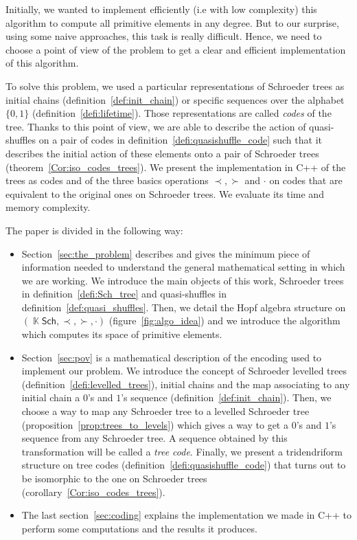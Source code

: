 \documentclass[a4paper,10pt]{amsart}
\DeclareMathOperator{\K}{\mathbb{K}}
\newcommand\Sch{\mathsf{Sch}}
\newcommand{\Schw}{Schroeder} %
\theoremstyle{definition}
\begin{document}
Initially, we wanted to implement efficiently (i.e  with low complexity) this algorithm to compute all primitive elements in any degree.
But to our surprise, using some naive approaches, this task is really difficult. Hence, we need to choose a point of view of the problem to get a clear and efficient implementation of this algorithm. 

To solve this problem, we used a particular representations of \Schw{} trees as initial chains (definition~\ref{def:init_chain}) or specific sequences over the alphabet $\{0,1\}$ (definition~\ref{defi:lifetime}). Those representations are called \emph{codes} of the tree. Thanks to this point of view, we are able to describe the action of quasi-shuffles on a pair of codes in definition~\ref{defi:quasishuffle_code} such that it describes the initial action of these elements onto a pair of \Schw{} trees (theorem~\ref{Cor:iso_codes_trees}). We present the implementation in {\ttfamily  C++} of the trees as codes and of the three basics operations $\prec, \succ$ and $\cdot$ on codes that are equivalent to the original ones on \Schw{} trees. We evaluate its time and memory complexity.


The paper is divided in the following way:
\begin{itemize}
	\item Section~\ref{sec:the_problem} describes and gives the minimum piece of information needed to understand the general mathematical setting in which we are working. We introduce the main objects of this work, \Schw{} trees in definition~\ref{defi:Sch_tree} and quasi-shuffles in definition~\ref{def:quasi_shuffles}. Then, we detail the Hopf algebra structure on $(\K\Sch,\prec, \succ, \cdot)$ (figure~\ref{fig:algo_idea}) and we introduce the algorithm which computes its space of primitive elements.
	\item Section~\ref{sec:pov} is a mathematical description of the encoding used to implement our problem. We introduce the concept of \Schw{} levelled trees (definition~\ref{defi:levelled_trees}), initial chains and the map associating to any initial chain a $0$'s  and $1$'s sequence (definition~\ref{def:init_chain}). Then, we choose a way to map any \Schw{} tree to a levelled \Schw{} tree (proposition~\ref{prop:trees_to_levels}) which gives a way to get a $0$'s and $1$'s	sequence from any \Schw{} tree. A sequence obtained by this transformation will be called a \emph{tree code}. Finally, we present a tridendriform structure on tree codes (definition~\ref{defi:quasishuffle_code}) that turns out to be isomorphic to the one on \Schw{} trees (corollary~\ref{Cor:iso_codes_trees}).
	\item The last section~\ref{sec:coding} explains the implementation we made in {\ttfamily C++} to perform some computations and the results it produces. 
\end{itemize}
\end{document}
